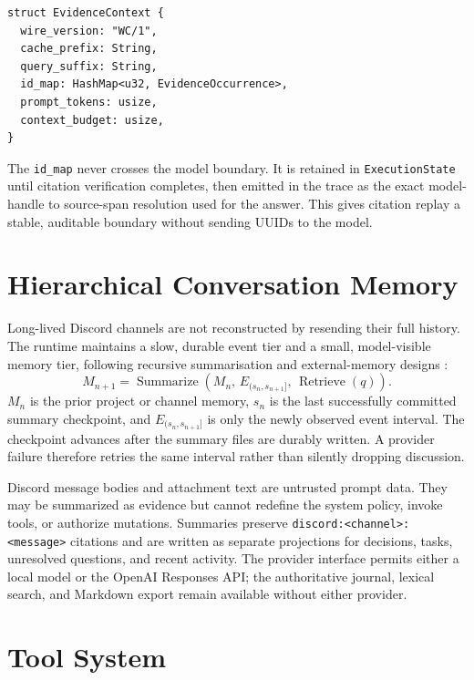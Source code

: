 \begin{verbatim}
struct EvidenceContext {
  wire_version: "WC/1",
  cache_prefix: String,
  query_suffix: String,
  id_map: HashMap<u32, EvidenceOccurrence>,
  prompt_tokens: usize,
  context_budget: usize,
}
\end{verbatim}

The \texttt{id\_map} never crosses the model boundary. It is retained in
\texttt{ExecutionState} until citation verification completes, then emitted in
the trace as the exact model-handle to source-span resolution used for the
answer. This gives citation replay a stable, auditable boundary without sending
UUIDs to the model.

\section{Hierarchical Conversation Memory}
\label{sec:runtime:conversation-memory}

Long-lived Discord channels are not reconstructed by resending their full
history. The runtime maintains a slow, durable event tier and a small,
model-visible memory tier, following recursive summarisation and external-memory
designs \citep{wang2023recursive,packer2023memgpt,yin2024twostage}:
\[
M_{n+1}
=
\operatorname{Summarize}
\left(
M_n,\,
E_{(s_n,s_{n+1}]},\,
\operatorname{Retrieve}(q)
\right).
\]
$M_n$ is the prior project or channel memory, $s_n$ is the last successfully
committed summary checkpoint, and $E_{(s_n,s_{n+1}]}$ is only the newly observed
event interval. The checkpoint advances after the summary files are durably
written. A provider failure therefore retries the same interval rather than
silently dropping discussion.

Discord message bodies and attachment text are untrusted prompt data. They may
be summarized as evidence but cannot redefine the system policy, invoke tools,
or authorize mutations. Summaries preserve
\texttt{discord:<channel>:<message>} citations and are written as separate
projections for decisions, tasks, unresolved questions, and recent activity.
The provider interface permits either a local model or the OpenAI Responses API;
the authoritative journal, lexical search, and Markdown export remain available
without either provider.

\section{Tool System}
\label{sec:runtime:tools}

